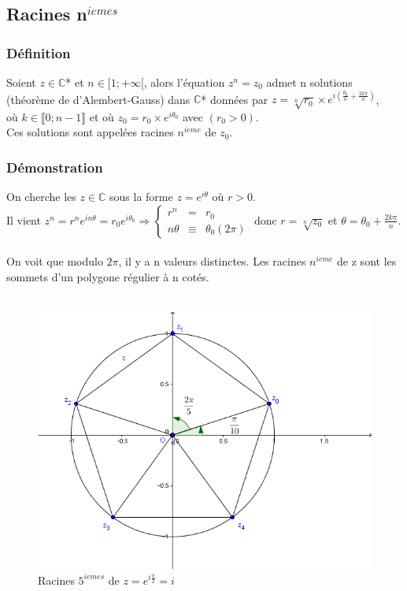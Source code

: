 \documentclass[a4paper,10pt]{book}
\newcommand{\C}{\mathbb{C}}
\begin{document}
\subsection{Racines n$^{iemes}$}
\subsubsection{Définition}
Soient $z \in \C$* et $n \in [1;+\infty[$, alors l’équation $z^{n}=z_{0}$ admet n solutions (théorème de d'Alembert-Gauss) dans $\C$* données par $z=\sqrt[n]{r_{0}}\times e^{i(\frac{\theta_{0}}{n}+\frac{2k\pi}{n})}$,\\
où $k \in \llbracket 0;n-1 \rrbracket$ et où $z_{0}=r_{0}\times e^{i\theta_{0}}$ avec $(r_{0}>0)$.\\

Ces solutions sont appelées racines $n^{ieme}$ de $z_{0}$.

\subsubsection{Démonstration}
On cherche les $z \in \C$ sous la forme $z=e^{i\theta}$ où $r>0$.\\
Il vient $z^{n}=r^{n}e^{in\theta}=r_{0}e^{i\theta _{0}} \Rightarrow \left \{ \begin{array}{rcl} r^{n}&=&r_{0} \\ n\theta &\equiv &\theta_{0} (2\pi) \end{array} \right .$ donc $r=\sqrt[n]{z_{0}}$ et $\theta=\theta_{0}+\frac{2k\pi}{n}$.\\\\

On voit que modulo $2\pi$, il y a n valeurs distinctes. Les racines $n^{ieme}$ de z sont les sommets d'un polygone régulier à n cotés.\\\\

\begin{figure}[h] \begin{center}
\includegraphics[scale=0.55]{images/202.png}
\caption{Racines $5^{iemes}$ de $z=e^{i\frac{\pi}{2}}=i$}
\end{center} \end{figure}
\end{document}
